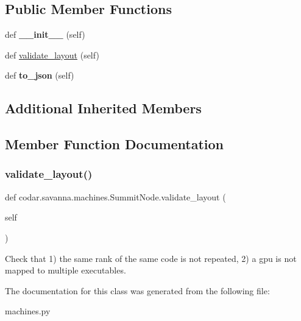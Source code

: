 \subsection*{Public Member Functions}
\begin{DoxyCompactItemize}
\item 
\mbox{\label{classcodar_1_1savanna_1_1machines_1_1_summit_node_acc0c2a15d2204b3d5f547200fd4d055f}} 
def {\bfseries \+\_\+\+\_\+init\+\_\+\+\_\+} (self)
\item 
def \hyperlink{classcodar_1_1savanna_1_1machines_1_1_summit_node_a3360461b2a21624400e0ecdf052c8447}{validate\+\_\+layout} (self)
\item 
\mbox{\label{classcodar_1_1savanna_1_1machines_1_1_summit_node_a7db80709d8a4ebc806559a03b9be8b68}} 
def {\bfseries to\+\_\+json} (self)
\end{DoxyCompactItemize}
\subsection*{Additional Inherited Members}


\subsection{Member Function Documentation}
\mbox{\label{classcodar_1_1savanna_1_1machines_1_1_summit_node_a3360461b2a21624400e0ecdf052c8447}} 
\subsubsection{\texorpdfstring{validate\+\_\+layout()}{validate\_layout()}}
{\footnotesize\ttfamily def codar.\+savanna.\+machines.\+Summit\+Node.\+validate\+\_\+layout (\begin{DoxyParamCaption}\item[{}]{self }\end{DoxyParamCaption})}

\begin{DoxyVerb}Check that 1) the same rank of the same code is not repeated,
2) a gpu is not mapped to multiple executables.\end{DoxyVerb}
 

The documentation for this class was generated from the following file\+:\begin{DoxyCompactItemize}
\item 
machines.\+py\end{DoxyCompactItemize}
